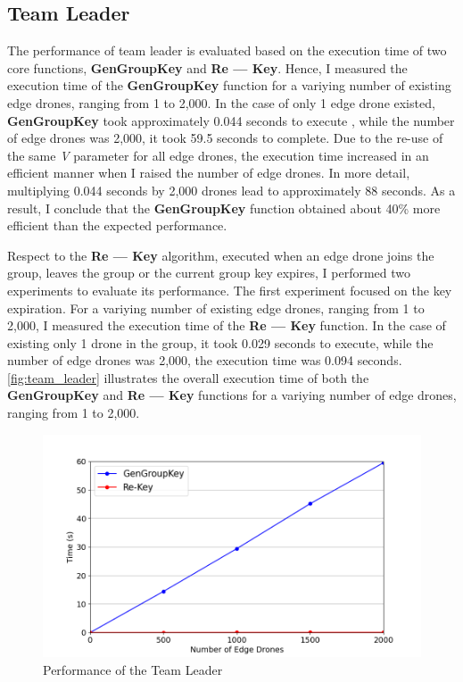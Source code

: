 \documentclass{article}
\begin{document}
\subsection{Team Leader}
%
The performance of team leader is evaluated based on the execution time of two
core functions, \textbf{GenGroupKey} and \textbf{Re --- Key}. Hence, I measured
the execution time of the \textbf{GenGroupKey} function for a variying number
of existing edge drones, ranging from 1 to 2,000. In the case of only 1 edge
drone existed, \textbf{GenGroupKey} took approximately 0.044 seconds to execute
, while the number of edge drones was 2,000, it took 59.5 seconds to complete.
Due to the re-use of the same \emph{V} parameter for all edge drones, the execution
time increased in an efficient manner when I raised the number of edge drones.
In more detail, multiplying 0.044 seconds by 2,000 drones lead to approximately 88
seconds. As a result, I conclude that the \textbf{GenGroupKey} function obtained
about 40\% more efficient than the expected performance.

Respect to the \textbf{Re --- Key} algorithm, executed when an edge drone joins
the group, leaves the group or the current group key expires, I performed two
experiments to evaluate its performance. The first experiment focused on the key expiration.
For a variying
number of existing edge drones, ranging from 1 to 2,000, I measured the execution
time of the \textbf{Re --- Key} function. In the case of existing only 1 drone in
the group, it took 0.029 seconds to execute, while the number of edge drones was
2,000, the execution time was 0.094 seconds. \autoref{fig:team_leader} illustrates
the overall execution time of both the \textbf{GenGroupKey} and \textbf{Re --- Key}
functions for a variying number of edge drones, ranging from 1 to 2,000.

\begin{figure}[!ht]
    \centering
    \includegraphics[height=\textheight,width=\textwidth,keepaspectratio]
    {leader_performance.png}
    \caption{Performance of the Team Leader}\label{fig:team_leader}
\end{figure}
\end{document}

